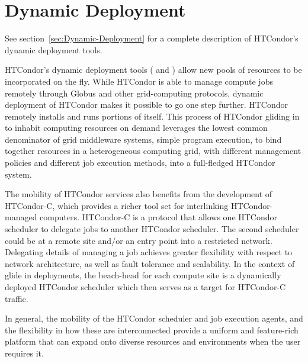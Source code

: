 \section{\label{sec:Deployment}Dynamic Deployment}

See section~\ref{sec:Dynamic-Deployment}
for a complete description of HTCondor's dynamic deployment tools.

HTCondor's dynamic deployment tools
( and )
allow new pools of resources to be  incorporated on the fly.
While HTCondor is able to manage compute jobs remotely 
through Globus and other grid-computing protocols,
dynamic deployment of HTCondor makes it possible to go one step further.
HTCondor remotely installs and runs portions of itself.
This process of HTCondor gliding in to inhabit computing resources
on demand leverages the lowest common denominator of grid middleware systems,
simple program  execution,
to bind together resources in a heterogeneous computing grid,
with different management policies and different job execution methods,
into a full-fledged HTCondor system. 

The mobility of HTCondor services also benefits from
the development  of HTCondor-C,
which provides a richer tool set for interlinking HTCondor-managed computers.
HTCondor-C is a protocol that allows one HTCondor scheduler
to delegate jobs to another HTCondor scheduler.
The second scheduler could be at a remote site and/or an entry point
into a restricted network.
Delegating details of managing a job
achieves greater flexibility with respect to network architecture,
as well as fault tolerance and scalability.
In the  context of glide in deployments,
the beach-head for each compute site is a dynamically deployed
HTCondor scheduler which then serves as a target for HTCondor-C traffic.

In general,
the mobility of the HTCondor scheduler and job execution agents,
and the flexibility in how these are interconnected
provide a uniform and feature-rich platform
that can expand onto diverse resources and environments
when the user requires it.


